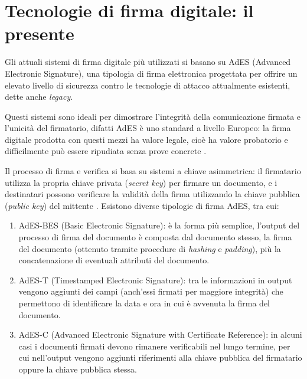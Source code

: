 \section{Tecnologie di firma digitale: il presente}

Gli attuali sistemi di firma digitale più utilizzati si basano su AdES (Advanced Electronic Signature), una tipologia di firma elettronica progettata per offrire un elevato livello di sicurezza contro le tecnologie di attacco attualmente esistenti, dette anche \textit{legacy}. 

Questi sistemi sono ideali per dimostrare l'integrità della comunicazione firmata e l'unicità del firmatario, difatti AdES è uno standard a livello Europeo: la firma digitale prodotta con questi mezzi ha valore legale, cioè ha valore probatorio e difficilmente può essere ripudiata senza prove concrete \cite{EU2024_1183}.

Il processo di firma e verifica si basa su sistemi a chiave asimmetrica: il firmatario utilizza la propria chiave privata (\textit{secret key}) per firmare un documento, e i destinatari possono verificare la validità della firma utilizzando la chiave pubblica (\textit{public key}) del mittente \cite{ETSI31910201}. Esistono diverse tipologie di firma AdES, tra cui:
\begin{enumerate}
    \item AdES-BES (Basic Electronic Signature): è la forma più semplice, l'output del processo di firma del documento è composta dal documento stesso, la firma del documento (ottenuto tramite procedure di \textit{hashing} e \textit{padding}), più la concatenazione di eventuali attributi del documento.
    \item AdES-T (Timestamped Electronic Signature): tra le informazioni in output vengono aggiunti dei campi (anch'essi firmati per maggiore integrità) che permettono di identificare la data e ora in cui è avvenuta la firma del documento.
    \item AdES-C (Advanced Electronic Signature with Certificate Reference): in alcuni casi i documenti firmati devono rimanere verificabili nel lungo termine, per cui nell'output vengono aggiunti riferimenti alla chiave pubblica del firmatario oppure la chiave pubblica stessa.
\end{enumerate}

